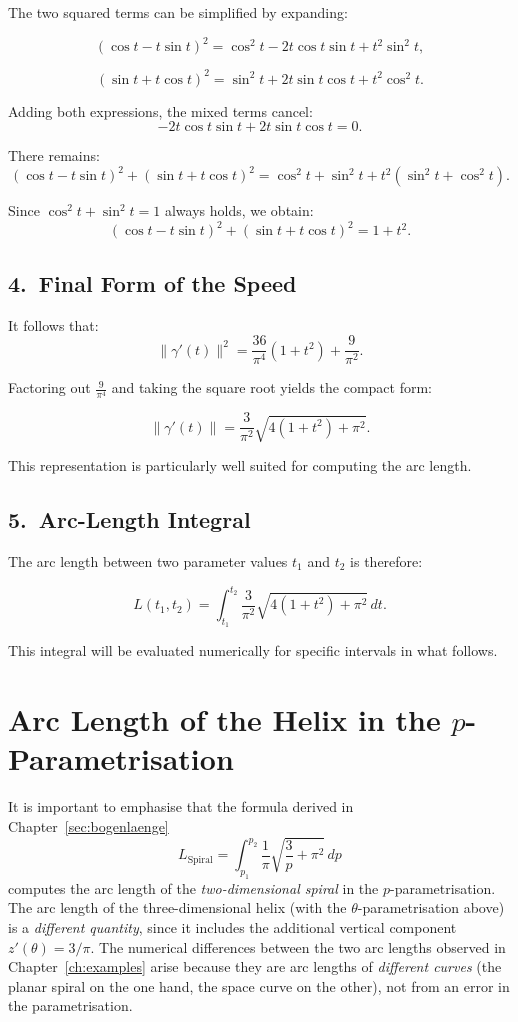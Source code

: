 The two squared terms can be simplified by expanding:

\[
(\cos t - t\sin t)^{2}
= \cos^{2}t - 2t\cos t\sin t + t^{2}\sin^{2}t,
\]

\[
(\sin t + t\cos t)^{2}
= \sin^{2}t + 2t\sin t\cos t + t^{2}\cos^{2}t.
\]

Adding both expressions, the mixed terms cancel:
\[
-2t\cos t\sin t + 2t\sin t\cos t = 0.
\]

There remains:
\[
(\cos t - t\sin t)^{2} + (\sin t + t\cos t)^{2}
= \cos^{2}t + \sin^{2}t + t^{2}(\sin^{2}t + \cos^{2}t).
\]

Since $\cos^{2}t + \sin^{2}t = 1$ always holds, we obtain:
\[
(\cos t - t\sin t)^{2} + (\sin t + t\cos t)^{2}
= 1 + t^{2}.
\]

\subsection*{4.\ Final Form of the Speed}

It follows that:
\[
\|\gamma'(t)\|^{2}
= \frac{36}{\pi^{4}}(1+t^{2}) + \frac{9}{\pi^{2}}.
\]

Factoring out $\frac{9}{\pi^4}$ and taking the square root yields the
compact form:

\[
\boxed{
\|\gamma'(t)\|
= \frac{3}{\pi^{2}}\sqrt{4(1+t^{2}) + \pi^{2}}
}.
\]

This representation is particularly well suited for computing the arc length.

\subsection*{5.\ Arc-Length Integral}

The arc length between two parameter values $t_1$ and $t_2$ is therefore:

\[
\boxed{
L(t_{1},t_{2})
= \int_{t_{1}}^{t_{2}}
\frac{3}{\pi^{2}}\sqrt{4(1+t^{2}) + \pi^{2}}\,dt.
}
\]

This integral will be evaluated numerically for specific intervals in what
follows.
\section{Arc Length of the Helix in the \texorpdfstring{$p$}{p}-Parametrisation}

It is important to emphasise that the formula derived in
Chapter~\ref{sec:bogenlaenge}
\begin{equation}
L_{\mathrm{Spiral}} = \int_{p_1}^{p_2}
\frac{1}{\pi}\sqrt{\frac{3}{p} + \pi^2}\, dp
\end{equation}
computes the arc length of the \emph{two-dimensional spiral} in the
$p$-parametrisation. The arc length of the three-dimensional helix (with the
$\theta$-parametrisation above) is a \emph{different quantity}, since it
includes the additional vertical component $z'(\theta) = 3/\pi$. The
numerical differences between the two arc lengths observed in
Chapter~\ref{ch:examples} arise because they are arc lengths of
\emph{different curves} (the planar spiral on the one hand, the space curve
on the other), not from an error in the parametrisation.

